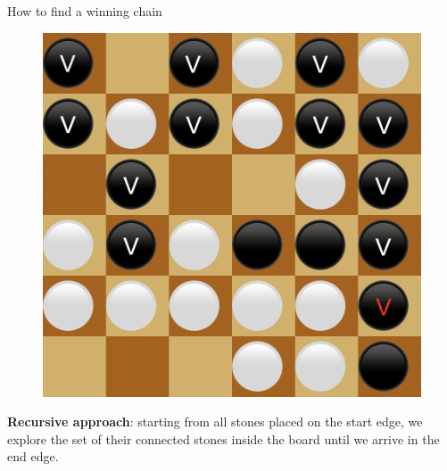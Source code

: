 \documentclass{beamer}
\begin{document}
\begin{frame}{How to find a winning chain}
{		\begin{figure}[t]
			\includegraphics[scale=0.2]{images/chain/12.png}
		\end{figure}
		
		\textbf{Recursive approach}: starting from all stones placed on the start edge, we explore the set of their connected stones inside the board until we arrive in the end edge.
	}

\end{frame}
\end{document}
